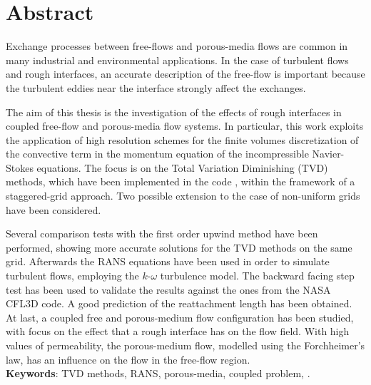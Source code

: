 \chapter*{Abstract}
Exchange processes between free-flows and porous-media flows are common in many 
industrial and environmental applications. In the case of turbulent flows and 
rough interfaces, an accurate description of the free-flow is important because 
the turbulent eddies near the interface strongly affect the exchanges.

The aim of this thesis is the investigation of the effects of rough interfaces in coupled free-flow and porous-media flow systems. In particular, this work exploits the application of high resolution schemes for 
the finite volumes discretization of the convective term in the momentum 
equation of the incompressible Navier-Stokes equations. The 
focus is on the Total Variation Diminishing (TVD) methods, which have been 
implemented in the code \DUMUX, within the framework of a staggered-grid 
approach. Two possible extension to the case of non-uniform grids have been 
considered.

Several comparison tests with the first order upwind method have been 
performed, showing more accurate solutions for the TVD methods on the same grid.
Afterwards the RANS equations have been used in order to simulate turbulent 
flows, employing the $k\text{-}\omega$ turbulence model. The backward facing 
step test has been used to validate the results against the 
ones from the NASA CFL3D code. A good prediction of the reattachment length has 
been obtained. At last, a coupled free and porous-medium flow configuration has 
been studied, with focus on the effect that a rough interface has on the flow 
field. With high values of permeability, the porous-medium flow, modelled using 
the Forchheimer's law, has an influence on the flow in the free-flow region.
\\[\baselineskip]
\textbf{Keywords}: TVD methods, RANS, porous-media, coupled problem, \DUMUX.